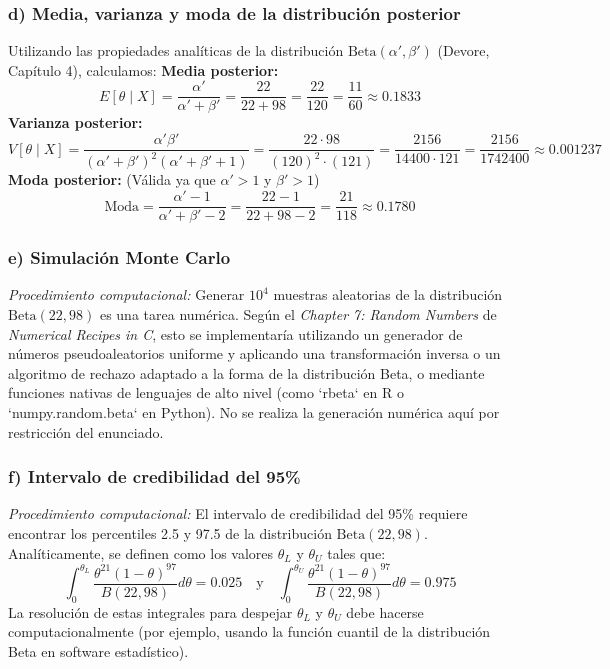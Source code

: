 \documentclass[12pt]{article}
\begin{document}
\subsubsection*{d) Media, varianza y moda de la distribución posterior}
Utilizando las propiedades analíticas de la distribución $\text{Beta}(\alpha', \beta')$ (Devore, Capítulo 4), calculamos:
\textbf{Media posterior:}
$$
E[\theta \mid X] = \frac{\alpha'}{\alpha' + \beta'} = \frac{22}{22 + 98} = \frac{22}{120} = \frac{11}{60} \approx 0.1833
$$
\textbf{Varianza posterior:}
$$
V[\theta \mid X] = \frac{\alpha' \beta'}{(\alpha' + \beta')^2 (\alpha' + \beta' + 1)} = \frac{22 \cdot 98}{(120)^2 \cdot (121)} = \frac{2156}{14400 \cdot 121} = \frac{2156}{1742400} \approx 0.001237
$$
\textbf{Moda posterior:} (Válida ya que $\alpha' > 1$ y $\beta' > 1$)
$$
\text{Moda} = \frac{\alpha' - 1}{\alpha' + \beta' - 2} = \frac{22 - 1}{22 + 98 - 2} = \frac{21}{118} \approx 0.1780
$$

\subsubsection*{e) Simulación Monte Carlo}
\textit{Procedimiento computacional:} Generar $10^4$ muestras aleatorias de la distribución $\text{Beta}(22, 98)$ es una tarea numérica. Según el \textit{Chapter 7: Random Numbers} de \textit{Numerical Recipes in C}, esto se implementaría utilizando un generador de números pseudoaleatorios uniforme y aplicando una transformación inversa o un algoritmo de rechazo adaptado a la forma de la distribución Beta, o mediante funciones nativas de lenguajes de alto nivel (como `rbeta` en R o `numpy.random.beta` en Python). No se realiza la generación numérica aquí por restricción del enunciado.

\subsubsection*{f) Intervalo de credibilidad del 95\%}
\textit{Procedimiento computacional:} El intervalo de credibilidad del 95\% requiere encontrar los percentiles 2.5 y 97.5 de la distribución $\text{Beta}(22, 98)$. Analíticamente, se definen como los valores $\theta_{L}$ y $\theta_{U}$ tales que:
$$
\int_{0}^{\theta_{L}} \frac{\theta^{21}(1-\theta)^{97}}{B(22, 98)} d\theta = 0.025 \quad \text{y} \quad \int_{0}^{\theta_{U}} \frac{\theta^{21}(1-\theta)^{97}}{B(22, 98)} d\theta = 0.975
$$
La resolución de estas integrales para despejar $\theta_{L}$ y $\theta_{U}$ debe hacerse computacionalmente (por ejemplo, usando la función cuantil de la distribución Beta en software estadístico).
\end{document}
